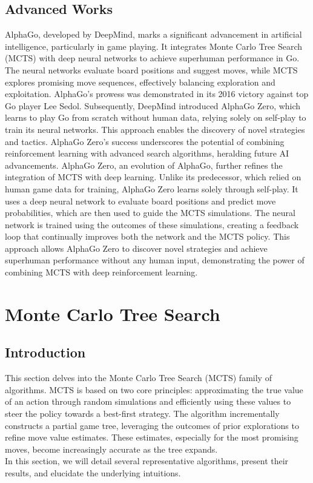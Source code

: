 \documentclass[11pt]{article}
\theoremstyle{definitionstyle}
\begin{document}
\subsection{Advanced Works}
AlphaGo\cite{silver2017mastering}, developed by DeepMind, marks a significant advancement in artificial intelligence, particularly in game playing. It integrates Monte Carlo Tree Search (MCTS) with deep neural networks to achieve superhuman performance in Go. The neural networks evaluate board positions and suggest moves, while MCTS explores promising move sequences, effectively balancing exploration and exploitation. AlphaGo's prowess was demonstrated in its 2016 victory against top Go player Lee Sedol. Subsequently, DeepMind introduced AlphaGo Zero, which learns to play Go from scratch without human data, relying solely on self-play to train its neural networks. This approach enables the discovery of novel strategies and tactics. AlphaGo Zero's success underscores the potential of combining reinforcement learning with advanced search algorithms, heralding future AI advancements.
AlphaGo Zero, an evolution of AlphaGo, further refines the integration of MCTS with deep learning. Unlike its predecessor, which relied on human game data for training, AlphaGo Zero learns solely through self-play. It uses a deep neural network to evaluate board positions and predict move probabilities, which are then used to guide the MCTS simulations. The neural network is trained using the outcomes of these simulations, creating a feedback loop that continually improves both the network and the MCTS policy. This approach allows AlphaGo Zero to discover novel strategies and achieve superhuman performance without any human input, demonstrating the power of combining MCTS with deep reinforcement learning.
\section{Monte Carlo Tree Search}
\subsection{Introduction}
This section delves into the Monte Carlo Tree Search (MCTS) family of algorithms. MCTS is based on two core principles: approximating the true value of an action through random simulations and efficiently using these values to steer the policy towards a best-first strategy. The algorithm incrementally constructs a partial game tree, leveraging the outcomes of prior explorations to refine move value estimates. These estimates, especially for the most promising moves, become increasingly accurate as the tree expands.\\
In this section, we will detail several representative algorithms, present their results, and elucidate the underlying intuitions.
\end{document}

